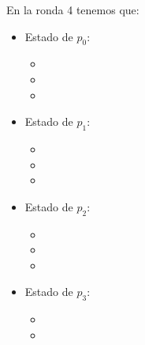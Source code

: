 En la ronda 4 tenemos que:

\begin{multicols}{2}
\begin{itemize}
\item Estado de $p_0$:
      \begin{itemize}
      \item {}
      
      \item {}
      
      \item {}
      \end{itemize}
      
\item Estado de $p_1$:
      \begin{itemize}
      \item {}
      
      \item {}
      
      \item {}
      \end{itemize}

\item Estado de $p_2$:
      \begin{itemize}
      \item {}
      
      \item {}
      
      \item {}
      \end{itemize}

\item Estado de $p_3$:
      \begin{itemize}
      \item {}
      
      \item {}
      

\end{itemize}
\end{itemize}
\end{multicols}
